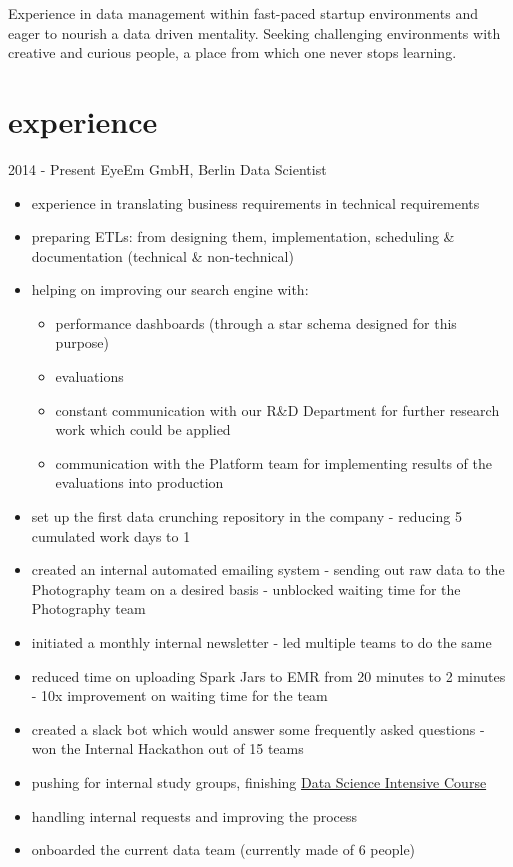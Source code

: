 \documentclass[]{friggeri-cv}
\begin{document}
Experience in data management within fast-paced startup environments and eager to nourish a data driven mentality. Seeking challenging environments with creative and curious people, a place from which one never stops learning. 

\section{experience}

\begin{entrylist}
  \entry
    {2014 - Present}
    { EyeEm GmbH, Berlin}
    {Data Scientist}
    {\begin{itemize}
    \item experience in translating business requirements in technical requirements
    \item preparing ETLs: from designing them, implementation, scheduling \& documentation (technical \& non-technical)
    \item helping on improving our search engine with:
      {\begin{itemize}
        \item performance dashboards (through a star schema designed for this purpose)
        \item evaluations
        \item constant communication with our R\&D Department for further research work which could be applied
        \item communication with the Platform team for implementing results of the evaluations into production
      \end{itemize}}
    \item set up the first data crunching repository in the company - reducing 5 cumulated work days to 1
    \item created an internal automated emailing system - sending out raw data to the Photography team on a desired basis - unblocked waiting time for the Photography team
    \item initiated a monthly internal newsletter - led multiple teams to do the same
    \item reduced time on uploading Spark Jars to EMR from 20 minutes to 2 minutes - 10x improvement on waiting time for the team
    \item created a slack bot which would answer some frequently asked questions - won the Internal Hackathon out of 15 teams
    \item pushing for internal study groups, finishing {\color{lightgrey}\href{https://www.springboard.com/workshops/data-science-intensive} {Data Science Intensive Course}}
    \item handling internal requests and improving the process
    \item onboarded the current data team (currently made of 6 people)
    \end{itemize}}


\end{entrylist}
\end{document}
